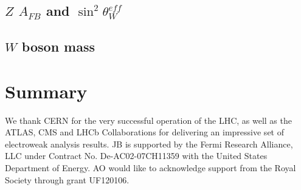 \documentclass[12pt]{iopart}
\begin{document}
\label{s-ewk-prec-tests}
\subsection{$Z$ $A_{FB}$ and $\sin^2\theta^{eff}_{W}$}


\subsection{$W$ boson mass}

\clearpage

\section{Summary}


\ack
We thank CERN for the very successful operation of the LHC,
as well as the ATLAS, CMS and LHCb Collaborations for delivering an impressive 
set of electroweak analysis results.
JB is supported by the Fermi Research Alliance, LLC under Contract
No. De-AC02-07CH11359 with the United States Department of Energy.
AO would like to acknowledge support from the Royal Society through grant \mbox{UF120106}.

\mbox{}




\end{document}
